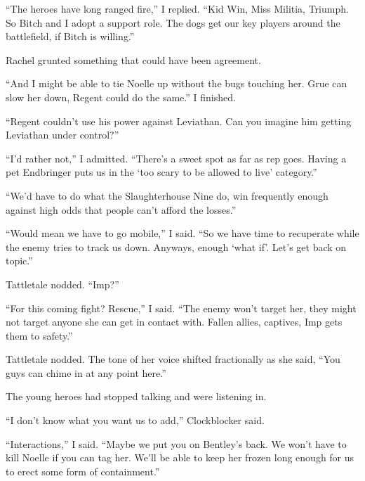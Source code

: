 ``The heroes have long ranged fire,'' I replied.  ``Kid Win, Miss Militia, Triumph.  So Bitch and I adopt a support role.  The dogs get our key players around the battlefield, if Bitch is willing.''



Rachel grunted something that could have been agreement.



``And I might be able to tie Noelle up without the bugs touching her.  Grue can slow her down, Regent could do the same.'' I finished.



``Regent couldn't use his power against Leviathan.  Can you imagine him getting Leviathan under control?''



``I'd rather not,'' I admitted.  ``There's a sweet spot as far as rep goes.  Having a pet Endbringer puts us in the `too scary to be allowed to live' category.''



``We'd have to do what the Slaughterhouse Nine do, win frequently enough against high odds that people can't afford the losses.''



``Would mean we have to go mobile,'' I said.  ``So we have time to recuperate while the enemy tries to track us down.  Anyways, enough `what if'.  Let's get back on topic.''



Tattletale nodded.  ``Imp?''



``For this coming fight?  Rescue,'' I said.  ``The enemy won't target her, they might not target anyone she can get in contact with.  Fallen allies, captives, Imp gets them to safety.''



Tattletale nodded.  The tone of her voice shifted fractionally as she said, ``You guys can chime in at any point here.''



The young heroes had stopped talking and were listening in.



``I don't know what you want us to add,'' Clockblocker said.



``Interactions,'' I said.  ``Maybe we put you on Bentley's back.  We won't have to kill Noelle if you can tag her.  We'll be able to keep her frozen long enough for us to erect some form of containment.''



